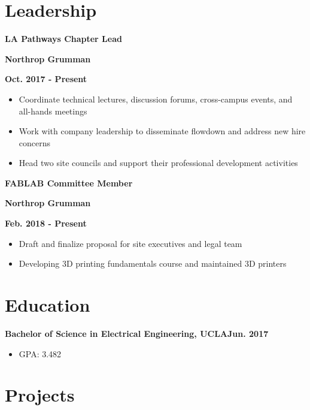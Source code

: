 \documentclass[12pt]{article}
\newcommand\textbox[1]{\parbox{.333\textwidth}{#1}}
\newcommand{\textlcr}[3]{\textbox{\textbf{#1}\hfill}\textbox{\hfil \textbf{#2}\hfil}\textbox{\hfill \textbf{#3}}}
\begin{document}
\section*{Leadership}
\vspace*{-1em}\makebox[\linewidth]{\rule{\textwidth}{0.4pt}}

\textlcr{LA Pathways Chapter Lead}{Northrop Grumman}{Oct. 2017 - Present}
\begin{itemize}
\item Coordinate technical lectures, discussion forums, cross-campus events, and all-hands meetings
\item Work with company leadership to disseminate flowdown and address new hire concerns
\item Head two site councils and support their professional development activities
\end{itemize}

\bigskip
\textlcr{FABLAB Committee Member}{Northrop Grumman}{Feb. 2018 - Present}
\begin{itemize}
\item Draft and finalize proposal for site executives and legal team
\item Developing 3D printing fundamentals course and maintained 3D printers
\end{itemize}

\section*{Education}
\vspace*{-1em}\makebox[\linewidth]{\rule{\textwidth}{0.4pt}}

\textbf{Bachelor of Science in Electrical Engineering, UCLA}\hfill\textbf{Jun. 2017}
\begin{itemize}
\item GPA: 3.482
\end{itemize}


\section*{Projects}
\vspace*{-1em}\makebox[\linewidth]{\rule{\textwidth}{0.4pt}}
\end{document}
